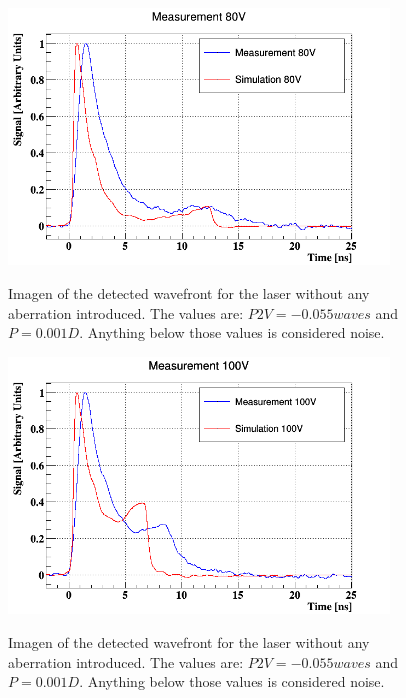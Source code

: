 \begin{figure}[h]
	\centering
	\includegraphics[width=0.9\textwidth]{80V.png}
	\label{fig:mues2}
	\caption{Imagen of the detected wavefront for the laser without any aberration introduced. The values are: $P2V = -0.055waves$ and $P = 0.001D$. Anything below those values is considered noise.}
\end{figure}

\begin{figure}[h]
	\centering
	\includegraphics[width=0.9\textwidth]{100V.png}
	\label{fig:mues2}
	\caption{Imagen of the detected wavefront for the laser without any aberration introduced. The values are: $P2V = -0.055waves$ and $P = 0.001D$. Anything below those values is considered noise.}
\end{figure}

